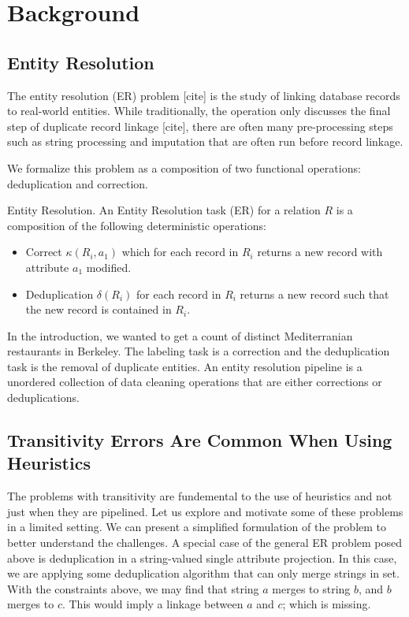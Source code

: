 \section{Background}

\subsection{Entity Resolution}
The entity resolution (ER) problem [cite] is the study of linking database records to real-world entities.
While traditionally, the operation only discusses the final step of duplicate record linkage [cite], there are often
many pre-processing steps such as string processing and imputation that are often run before record linkage.

We formalize this problem as a composition of two functional operations: deduplication and correction.
\begin{definition} Entity Resolution. 
An Entity Resolution task (ER) for a relation $R$ is a composition of the 
following deterministic operations:
\begin{itemize}
\item Correct $\kappa(R_i,a_{1})$ which for each record in $R_i$ returns a new record with attribute $a_{1}$ modified.
\item Deduplication $\delta(R_i)$ for each record in $R_i$ returns a new record such that the new record is contained in $R_i$.
\end{itemize}
\end{definition}

In the introduction, we wanted to get a count of distinct Mediterranian restaurants in Berkeley.
The labeling task is a correction and the deduplication task is the removal of duplicate entities.
An entity resolution pipeline is a unordered collection of data cleaning operations that are either corrections or
deduplications.

\subsection{Transitivity Errors Are Common When Using Heuristics}
The problems with transitivity are fundemental to the use of heuristics and not just when they are pipelined.
Let us explore and motivate some of these problems in a limited setting.
We can present a simplified formulation of the problem to better understand the challenges.
A special case of the general ER problem posed above is deduplication in a string-valued single attribute projection.
In this case, we are applying some deduplication algorithm that can only merge strings in set.
With the constraints above, we may find that string $a$ merges to string $b$, and $b$ merges to $c$. 
This would imply a linkage between $a$ and $c$; which is missing.

